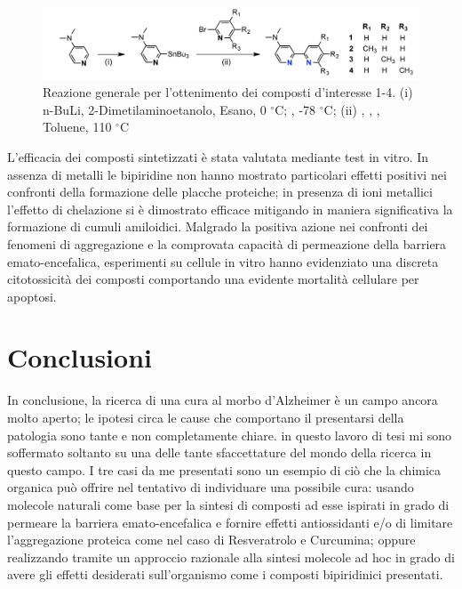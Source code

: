 \documentclass[a4paper, 11pt]{article}
\begin{document}
\begin{figure}[H]
	\centering
	\includegraphics[width=.8\linewidth]{immagini/rea_g.png}
	\caption{Reazione generale per l'ottenimento dei composti d'interesse 1-4. (i) n-BuLi, 2-Dimetilaminoetanolo, Esano, 0 $^\circ$C; , -78 $^\circ$C; (ii) , , , Toluene, 110 $^\circ$C }
	\label{fig:rea_g}
\end{figure}

L'efficacia dei composti sintetizzati è stata valutata mediante test in vitro. In assenza di metalli le bipiridine non hanno mostrato particolari effetti positivi nei confronti della formazione delle placche proteiche; in presenza di ioni metallici l'effetto di chelazione si è dimostrato efficace mitigando in maniera significativa la formazione di cumuli amiloidici. Malgrado la positiva azione nei confronti dei fenomeni di aggregazione e la comprovata capacità di permeazione della barriera emato-encefalica, esperimenti su cellule in vitro hanno evidenziato una discreta citotossicità dei composti comportando una evidente mortalità cellulare per apoptosi. \cite{ji_strategic_2017}

\section{Conclusioni}
In conclusione, la ricerca di una cura al morbo d'Alzheimer è un campo ancora molto aperto; le ipotesi circa le cause che comportano il presentarsi della patologia sono tante e non completamente chiare. in questo lavoro di tesi mi sono soffermato soltanto su una delle tante sfaccettature del mondo della ricerca in questo campo. I tre casi da me presentati sono un esempio di ciò che la chimica organica può offrire nel tentativo di individuare una possibile cura: usando molecole naturali come base per la sintesi di composti ad esse ispirati in grado di permeare la barriera emato-encefalica e fornire effetti antiossidanti e/o di limitare l'aggregazione proteica come nel caso di Resveratrolo e Curcumina; oppure realizzando tramite un approccio razionale alla sintesi molecole ad hoc in grado di avere gli effetti desiderati sull'organismo come i composti bipiridinici presentati.




\printbibliography
\end{document}
